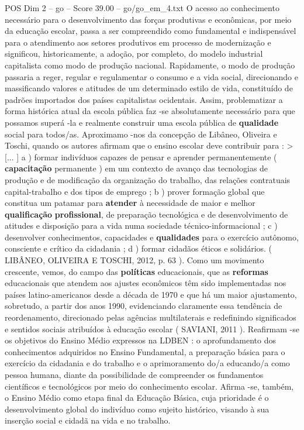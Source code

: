 \begin{textsample}{POS Dim 2 – go – Score 39.00 – go/go\_em\_4.txt}
O acesso ao conhecimento necessário para o desenvolvimento das forças produtivas e econômicas, por meio da educação escolar, passa a ser compreendido como fundamental e indispensável para o atendimento aos setores produtivos em processo de modernização e significou, historicamente, a adoção, por completo, do modelo industrial capitalista como modo de produção nacional.
Rapidamente, o modo de produção passaria a reger, regular e regulamentar o consumo e a vida social, direcionando e massificando valores e atitudes de um determinado estilo de vida, constituído de padrões importados dos países capitalistas ocidentais.
Assim, problematizar a forma histórica atual da escola pública faz -se absolutamente necessário para que possamos superá -la e realmente construir uma escola pública de \textbf{qualidade} social para todos/as.
Aproximamo -nos da concepção de Libâneo, Oliveira e Toschi, quando os autores afirmam que o ensino escolar deve contribuir para : > [... ] a ) formar indivíduos capazes de pensar e aprender permanentemente ( \textbf{capacitação} permanente ) em um contexto de avanço das tecnologias de produção e de modificação da organização do trabalho, das relações contratuais capital-trabalho e dos tipos de emprego ; b ) prover formação global que constitua um patamar para \textbf{atender} à necessidade de maior e melhor \textbf{qualificação} \textbf{profissional}, de preparação tecnológica e de desenvolvimento de atitudes e disposição para a vida numa sociedade técnico-informacional ; c ) desenvolver conhecimentos, capacidades e \textbf{qualidades} para o exercício autônomo, consciente e crítico da cidadania ; d ) formar cidadãos éticos e solidários. ( LIBÂNEO, OLIVEIRA E TOSCHI, 2012, p. 63 ).
Como um movimento crescente, vemos, do campo das \textbf{políticas} educacionais, que as \textbf{reformas} educacionais que atendem aos ajustes econômicos têm sido implementadas nos países latino-americanos desde a década de 1970 e que há um maior ajustamento, sobretudo, a partir dos anos 1990, evidenciando claramente essa tendência de reordenamento, direcionado pelas agências multilaterais e redefinindo significados e sentidos sociais atribuídos à educação escolar ( SAVIANI, 2011 ).
Reafirmam -se os objetivos do Ensino Médio expressos na LDBEN : o aprofundamento dos conhecimentos adquiridos no Ensino Fundamental, a preparação básica para o exercício da cidadania e do trabalho e o aprimoramento do/a educando/a como pessoa humana, diante da possibilidade de compreender os fundamentos científicos e tecnológicos por meio do conhecimento escolar.
Afirma -se, também, o Ensino Médio como etapa final da Educação Básica, cuja prioridade é o desenvolvimento global do indivíduo como sujeito histórico, visando à sua inserção social e cidadã na vida e no trabalho.

\end{textsample}
